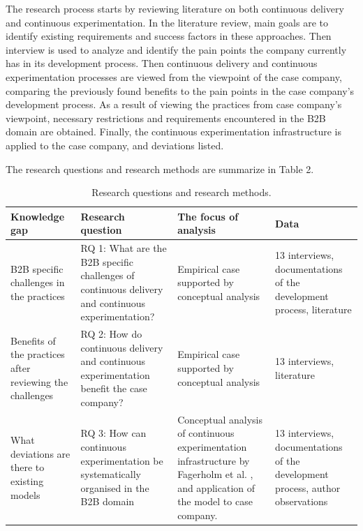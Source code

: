 \documentclass[english]{tktltiki2}
\theoremstyle{definition}
\theoremstyle{remark}
\begin{document}
The research process starts by reviewing literature on both continuous delivery and continuous experimentation. In the literature review, main goals are to identify existing requirements and success factors in these approaches. Then interview is used to analyze and identify the pain points the company currently has in its development process. Then continuous delivery and continuous experimentation processes are viewed from the viewpoint of the case company, comparing the previously found benefits to the pain points in the case company's development process. As a result of viewing the practices from case company's viewpoint, necessary restrictions and requirements encountered in the B2B domain are obtained. Finally, the continuous experimentation infrastructure \cite{fagerholm2014building} is applied to the case company, and deviations listed. 

The research questions and research methods are summarize in Table 2.

\begin{center}
\begin{table}[htb]
    \begin{tabular}{ | p{3cm} | p{3cm} | p{3cm} | p{3cm} |}
    \hline
    \textbf{Knowledge gap} & \textbf{Research question} & \textbf{The focus of analysis} & \textbf{Data} \\ \hline
    B2B specific challenges in the practices & RQ 1: What are the B2B specific challenges of continuous delivery and continuous experimentation? & Empirical case supported by conceptual analysis & 13 interviews, documentations of the development process, literature \\ \hline
    Benefits of the practices after reviewing the challenges & RQ 2: How do continuous delivery and continuous experimentation benefit the case company? & Empirical case supported by conceptual analysis & 13 interviews, literature \\ \hline
    What deviations are there to existing models & RQ 3: How can continuous experimentation be systematically organised in the B2B domain & Conceptual analysis of continuous experimentation infrastructure by Fagerholm et al. \cite{fagerholm2014building}, and application of the model to case company. & 13 interviews, documentations of the development process, author observations \\ \hline
    \end{tabular}
    \caption{Research questions and research methods.}
    \end{table}
\end{center}
\end{document}
